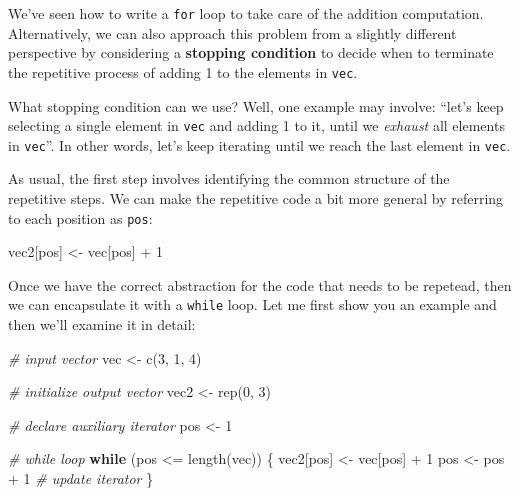 \documentclass[
]{book}
\newenvironment{Shaded}{\begin{snugshade}}{\end{snugshade}}
\newcommand{\CommentTok}[1]{\textcolor[rgb]{0.56,0.35,0.01}{\textit{#1}}}
\newcommand{\ControlFlowTok}[1]{\textcolor[rgb]{0.13,0.29,0.53}{\textbf{#1}}}
\newcommand{\DecValTok}[1]{\textcolor[rgb]{0.00,0.00,0.81}{#1}}
\newcommand{\FunctionTok}[1]{\textcolor[rgb]{0.00,0.00,0.00}{#1}}
\newcommand{\NormalTok}[1]{#1}
\newcommand{\OtherTok}[1]{\textcolor[rgb]{0.56,0.35,0.01}{#1}}
\newcommand{\SpecialCharTok}[1]{\textcolor[rgb]{0.00,0.00,0.00}{#1}}
\begin{document}
We've seen how to write a \texttt{for} loop to take care of the addition computation.
Alternatively, we can also approach this problem from a slightly different
perspective by considering a \textbf{stopping condition} to decide when to terminate
the repetitive process of adding 1 to the elements in \texttt{vec}.

What stopping condition can we use? Well, one example may involve: ``let's keep
selecting a single element in \texttt{vec} and adding 1 to it, until we \emph{exhaust}
all elements in \texttt{vec}''. In other words, let's keep iterating until we reach the
last element in \texttt{vec}.

As usual, the first step involves identifying the common structure of the
repetitive steps. We can make the repetitive code a bit more general by
referring to each position as \texttt{pos}:

\begin{Shaded}
\begin{Highlighting}[]
\NormalTok{vec2[pos] }\OtherTok{\textless{}{-}}\NormalTok{ vec[pos] }\SpecialCharTok{+} \DecValTok{1}
\end{Highlighting}
\end{Shaded}

Once we have the correct abstraction for the code that needs to be repetead,
then we can encapsulate it with a \texttt{while} loop. Let me first show you an
example and then we'll examine it in detail:

\begin{Shaded}
\begin{Highlighting}[]
\CommentTok{\# input vector}
\NormalTok{vec }\OtherTok{\textless{}{-}} \FunctionTok{c}\NormalTok{(}\DecValTok{3}\NormalTok{, }\DecValTok{1}\NormalTok{, }\DecValTok{4}\NormalTok{)}

\CommentTok{\# initialize output vector}
\NormalTok{vec2 }\OtherTok{\textless{}{-}} \FunctionTok{rep}\NormalTok{(}\DecValTok{0}\NormalTok{, }\DecValTok{3}\NormalTok{)}

\CommentTok{\# declare auxiliary iterator}
\NormalTok{pos }\OtherTok{\textless{}{-}} \DecValTok{1}

\CommentTok{\# while loop}
\ControlFlowTok{while}\NormalTok{ (pos }\SpecialCharTok{\textless{}=} \FunctionTok{length}\NormalTok{(vec)) \{}
\NormalTok{  vec2[pos] }\OtherTok{\textless{}{-}}\NormalTok{ vec[pos] }\SpecialCharTok{+} \DecValTok{1}
\NormalTok{  pos }\OtherTok{\textless{}{-}}\NormalTok{ pos }\SpecialCharTok{+} \DecValTok{1}  \CommentTok{\# update iterator}
\NormalTok{\}}
\end{Highlighting}
\end{Shaded}
\end{document}
